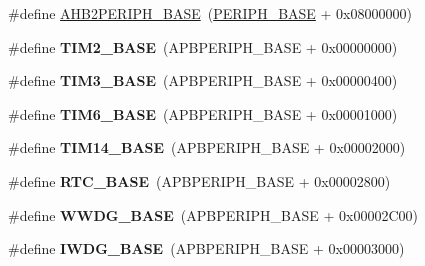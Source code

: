 \begin{DoxyCompactItemize}
\item 
\#define \hyperlink{group___peripheral__memory__map_gaeedaa71d22a1948492365e2cd26cfd46}{A\+H\+B2\+P\+E\+R\+I\+P\+H\+\_\+\+B\+A\+SE}~(\hyperlink{group___peripheral__memory__map_ga9171f49478fa86d932f89e78e73b88b0}{P\+E\+R\+I\+P\+H\+\_\+\+B\+A\+SE} + 0x08000000)
\item 
\mbox{\label{group___peripheral__memory__map_ga00d0fe6ad532ab32f0f81cafca8d3aa5}} 
\#define {\bfseries T\+I\+M2\+\_\+\+B\+A\+SE}~(A\+P\+B\+P\+E\+R\+I\+P\+H\+\_\+\+B\+A\+SE + 0x00000000)
\item 
\mbox{\label{group___peripheral__memory__map_gaf0c34a518f87e1e505cd2332e989564a}} 
\#define {\bfseries T\+I\+M3\+\_\+\+B\+A\+SE}~(A\+P\+B\+P\+E\+R\+I\+P\+H\+\_\+\+B\+A\+SE + 0x00000400)
\item 
\mbox{\label{group___peripheral__memory__map_ga8268ec947929f192559f28c6bf7d1eac}} 
\#define {\bfseries T\+I\+M6\+\_\+\+B\+A\+SE}~(A\+P\+B\+P\+E\+R\+I\+P\+H\+\_\+\+B\+A\+SE + 0x00001000)
\item 
\mbox{\label{group___peripheral__memory__map_ga862855347d6e1d92730dfe17ee8e90b8}} 
\#define {\bfseries T\+I\+M14\+\_\+\+B\+A\+SE}~(A\+P\+B\+P\+E\+R\+I\+P\+H\+\_\+\+B\+A\+SE + 0x00002000)
\item 
\mbox{\label{group___peripheral__memory__map_ga4265e665d56225412e57a61d87417022}} 
\#define {\bfseries R\+T\+C\+\_\+\+B\+A\+SE}~(A\+P\+B\+P\+E\+R\+I\+P\+H\+\_\+\+B\+A\+SE + 0x00002800)
\item 
\mbox{\label{group___peripheral__memory__map_ga9a5bf4728ab93dea5b569f5b972cbe62}} 
\#define {\bfseries W\+W\+D\+G\+\_\+\+B\+A\+SE}~(A\+P\+B\+P\+E\+R\+I\+P\+H\+\_\+\+B\+A\+SE + 0x00002\+C00)
\item 
\mbox{\label{group___peripheral__memory__map_ga8543ee4997296af5536b007cd4748f55}} 
\#define {\bfseries I\+W\+D\+G\+\_\+\+B\+A\+SE}~(A\+P\+B\+P\+E\+R\+I\+P\+H\+\_\+\+B\+A\+SE + 0x00003000)
\item 
\mbox{\label{group___peripheral__memory__map_gac3e357b4c25106ed375fb1affab6bb86}} 

\end{DoxyCompactItemize}
